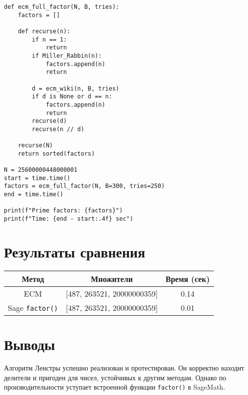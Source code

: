 \documentclass[12pt,a4paper]{article}
\begin{document}
\begin{lstlisting}
def ecm_full_factor(N, B, tries):
    factors = []

    def recurse(n):
        if n == 1:
            return
        if Miller_Rabbin(n):
            factors.append(n)
            return

        d = ecm_wiki(n, B, tries)
        if d is None or d == n:
            factors.append(n)
            return
        recurse(d)
        recurse(n // d)

    recurse(N)
    return sorted(factors)

N = 25600000448000001
start = time.time()
factors = ecm_full_factor(N, B=300, tries=250)
end = time.time()

print(f"Prime factors: {factors}")
print(f"Time: {end - start:.4f} sec")
\end{lstlisting}

\section*{Результаты сравнения}
\begin{tabular}{|c|c|c|}
\hline
Метод & Множители & Время (сек) \\
\hline
ECM & [487, 263521, 20000000359] & 0.14 \\
\hline
Sage \texttt{factor()} & [487, 263521, 20000000359] & 0.01 \\
\hline
\end{tabular}

\section*{Выводы}
Алгоритм Ленстры успешно реализован и протестирован. Он корректно находит делители и пригоден для чисел, устойчивых к другим методам. Однако по производительности уступает встроенной функции \texttt{factor()} в SageMath.
\end{document}
